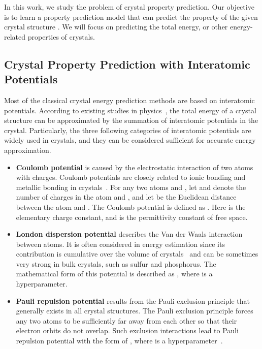 \documentclass[nohyperref]{article}
\theoremstyle{plain}
\theoremstyle{definition}
\theoremstyle{remark}
\begin{document}
In this work, we study the problem of crystal property prediction. Our objective is to learn a property prediction model  that can predict the property  of the given crystal structure . We will focus on predicting the total energy, or other energy-related properties of crystals.

\subsection{Crystal Property Prediction with Interatomic Potentials}
\label{background:potentail}

Most of the classical crystal energy prediction methods are based on interatomic potentials. According to existing studies in physics~\citep{west,eam,born}, the total energy of a crystal structure can be approximated by the summation of interatomic potentials in the crystal. Particularly, the three following categories of interatomic potentials are widely used in crystals, and they can be considered sufficient for accurate energy approximation.

\begin{itemize}[leftmargin=*]

\item \textbf{Coulomb potential} is caused by the electrostatic interaction of two atoms with charges. Coulomb potentials are closely related to ionic bonding and metallic bonding in crystals~\citep{west}. For any two atoms  and , let  and  denote the number of charges in the atom  and , and let  be the Euclidean distance between the atom  and . The Coulomb potential  is defined as . Here  is the elementary charge constant, and  is the permittivity constant of free space.

\item \textbf{London dispersion potential} describes the Van der Waals interaction between atoms. It is often considered in energy estimation since its contribution is cumulative over the volume of crystals~\citep{london} and can be sometimes very strong in bulk crystals, such as sulfur and phosphorus. The mathematical form of this potential is described as , where  is a hyperparameter.

\item \textbf{Pauli repulsion potential} results from the Pauli exclusion principle that generally exists in all crystal structures. The Pauli exclusion principle forces any two atoms to be sufficiently far away from each other so that their electron orbits do not overlap. Such exclusion interactions lead to Pauli repulsion potential with the form of , where  is a hyperparameter~\citep{buckingham,helium}.

\end{itemize}
\end{document}
